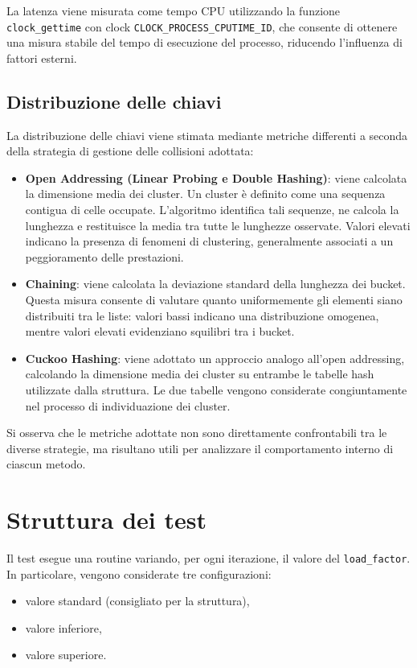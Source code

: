 La latenza viene misurata come tempo CPU utilizzando la funzione \texttt{clock\_gettime} con clock \texttt{CLOCK\_PROCESS\_CPUTIME\_ID}, 
che consente di ottenere una misura stabile del tempo di esecuzione del processo, riducendo l'influenza di fattori esterni.

\subsection*{Distribuzione delle chiavi}

La distribuzione delle chiavi viene stimata mediante metriche differenti a seconda della strategia di gestione delle collisioni adottata:

\begin{itemize}
    \item \textbf{Open Addressing (Linear Probing e Double Hashing)}: viene calcolata la dimensione media dei cluster. Un cluster è definito 
    come una sequenza contigua di celle occupate. L'algoritmo identifica tali sequenze, ne calcola la lunghezza e restituisce la media tra tutte 
    le lunghezze osservate. Valori elevati indicano la presenza di fenomeni di clustering, generalmente associati a un peggioramento delle prestazioni.

    \item \textbf{Chaining}: viene calcolata la deviazione standard della lunghezza dei bucket. Questa misura consente di valutare quanto 
    uniformemente gli elementi siano distribuiti tra le liste: valori bassi indicano una distribuzione omogenea, mentre valori elevati 
    evidenziano squilibri tra i bucket.

    \item \textbf{Cuckoo Hashing}: viene adottato un approccio analogo all'open addressing, calcolando la dimensione media dei cluster su entrambe 
    le tabelle hash utilizzate dalla struttura. Le due tabelle vengono considerate congiuntamente nel processo di individuazione dei cluster.
\end{itemize}

Si osserva che le metriche adottate non sono direttamente confrontabili tra le diverse strategie, ma risultano utili per analizzare il comportamento 
interno di ciascun metodo.

\section{Struttura dei test}

Il test esegue una routine variando, per ogni iterazione, il valore del \texttt{load\_factor}. In particolare, vengono considerate tre configurazioni:
\begin{itemize}
    \item valore standard (consigliato per la struttura),
    \item valore inferiore,
    \item valore superiore.
\end{itemize}

